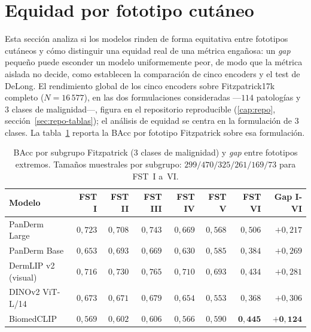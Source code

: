 \section{Equidad por fototipo cutáneo}
\label{sec:equidad-results}

Esta sección analiza si los modelos rinden de forma equitativa entre
fototipos cutáneos y cómo distinguir una equidad real de una métrica
engañosa: un \emph{gap} pequeño puede esconder un modelo
uniformemente peor, de modo que la métrica aislada no decide, como
establecen la comparación de cinco encoders y el test de DeLong. El rendimiento global de los cinco encoders sobre Fitzpatrick17k
completo ($N = 16\,577$), en las dos formulaciones consideradas
---$114$ patologías y $3$ clases de malignidad---, figura en el
repositorio reproducible (\ref{cap:repo}, sección~\ref{sec:repo-tablas}); el análisis
de equidad se centra en la formulación de $3$ clases. La
tabla~\ref{tab:equidad-fototipo} reporta la BAcc por fototipo
Fitzpatrick sobre esa formulación.

\begin{table}[htbp]
\centering
\footnotesize
\setlength{\tabcolsep}{4pt}
\renewcommand{\arraystretch}{0.95}
\caption{BAcc por subgrupo Fitzpatrick (3 clases de malignidad) y
\emph{gap} entre fototipos extremos. Tamaños muestrales por
subgrupo: $299 / 470 / 325 / 261 / 169 / 73$ para FST~I a~VI.}
\label{tab:equidad-fototipo}
\begin{tabular}{lrrrrrrr}
\hline
Modelo                    & FST I         & FST II        & FST III       & FST IV        & FST V         & FST VI        & Gap I-VI \\
\hline
PanDerm Large             & $0{,}723$     & $0{,}708$     & $0{,}743$     & $0{,}669$     & $0{,}568$     & $0{,}506$     & $+0{,}217$ \\
PanDerm Base              & $0{,}653$     & $0{,}693$     & $0{,}669$     & $0{,}630$     & $0{,}585$     & $0{,}384$     & $+0{,}269$ \\
DermLIP v2 (visual)       & $0{,}716$     & $0{,}730$     & $0{,}765$     & $0{,}710$     & $0{,}693$     & $0{,}434$     & $+0{,}281$ \\
DINOv2 ViT-L/14           & $0{,}673$     & $0{,}671$     & $0{,}679$     & $0{,}654$     & $0{,}553$     & $0{,}368$     & $+0{,}306$ \\
BiomedCLIP                & $0{,}569$     & $0{,}602$     & $0{,}606$     & $0{,}566$     & $0{,}590$     & $\mathbf{0{,}445}$ & $\mathbf{+0{,}124}$ \\
\hline
\end{tabular}
\end{table}

